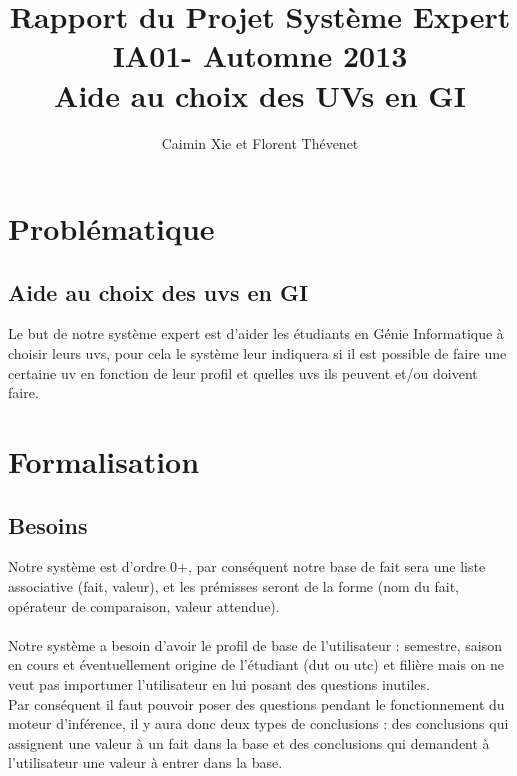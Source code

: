 \documentclass[a4paper, 12pt, final]{article}
\title{Rapport du Projet Système Expert\\
  IA01- Automne 2013
  \\Aide au choix des UVs en GI}
\author{Caimin Xie et Florent Thévenet}
\begin{document}
\maketitle{}
\newpage
\tableofcontents
\newpage
\section{Problématique}

\subsection{Aide au choix des uvs en GI}
Le but de notre système expert est d'aider les étudiants en Génie Informatique à choisir
leurs uvs, pour cela le système leur indiquera si il est possible de
faire une certaine uv en fonction de leur profil et quelles uvs ils
peuvent et/ou doivent faire.

\section{Formalisation}
\subsection{Besoins}
Notre système est d'ordre 0+, par conséquent notre base de fait sera
une liste associative (fait, valeur), et les prémisses seront de la
forme (nom du fait, opérateur de comparaison, valeur attendue).\\
\\
Notre système a besoin d'avoir le profil de base de l'utilisateur :
semestre, saison en cours et éventuellement origine de l'étudiant (dut
ou utc) et filière mais on ne veut pas importuner l'utilisateur en lui
posant des questions inutiles.\\
Par conséquent il faut pouvoir poser des questions pendant le
fonctionnement du moteur d'inférence, il y aura donc deux types de
conclusions : des conclusions qui assignent une valeur à un fait dans
la base et des conclusions qui demandent à l'utilisateur une valeur à
entrer dans la base.\\\\
\end{document}
